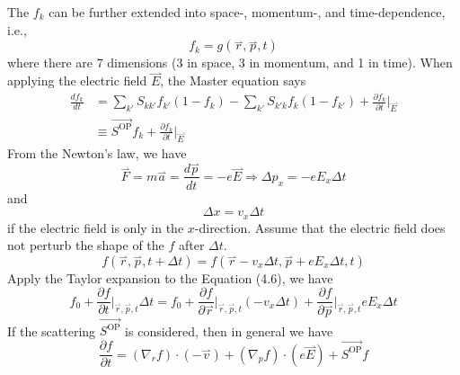The $f_{k}$ can be further extended into space-, momentum-, and time-dependence, i.e., \begin{equation}
    f_{k} = g(\overset{\rightharpoonup}{r}, \overset{\rightharpoonup}{p}, t)
\end{equation} where there are 7 dimensions (3 in space, 3 in momentum, and 1 in time). When applying the electric field $\overset{\rightharpoonup}{E}$, the Master equation says \begin{align}
    \frac{df_{k}}{dt}& = \sum_{k'}{S_{kk'}f_{k'}(1-f_{k})} - \sum_{k'}{S_{k'k}f_{k}(1-f_{k'})} + \frac{\partial f_{k}}{\partial t}\big|_{\overset{\rightharpoonup}{E}}\nonumber\\
    & \equiv \vec{S^{\text{OP}}}f_{k} + \frac{\partial f_{k}}{\partial t}\big|_{\overset{\rightharpoonup}{E}}
\end{align} From the Newton's law, we have \begin{equation}
    \overset{\rightharpoonup}{F} = m\overset{\rightharpoonup}{a} = \frac{d\overset{\rightharpoonup}{p}}{dt} = -e\overset{\rightharpoonup}{E}\Rightarrow\Delta p_{x} = -eE_{x}\Delta t
\end{equation} and \begin{equation}
    \Delta x = v_{x}\Delta t
\end{equation} if the electric field is only in the $x$-direction. Assume that the electric field does not perturb the shape of the $f$ after $\Delta t$. \begin{equation}
    f(\overset{\rightharpoonup}{r}, \overset{\rightharpoonup}{p}, t+\Delta t) = f(\overset{\rightharpoonup}{r}-v_{x}\Delta t, \overset{\rightharpoonup}{p}+eE_{x}\Delta t, t)
\end{equation} Apply the Taylor expansion to the Equation (4.6), we have \begin{equation}
    f_{0}+\frac{\partial f}{\partial t}\big|_{\overset{\rightharpoonup}{r}, \overset{\rightharpoonup}{p}, t}\Delta t = f_{0} + \frac{\partial f}{\partial \overset{\rightharpoonup}{r}}\big|_{\overset{\rightharpoonup}{r}, \overset{\rightharpoonup}{p}, t}(-v_{x}\Delta t) + \frac{\partial f}{\partial \overset{\rightharpoonup}{p}}\big|_{\overset{\rightharpoonup}{r}, \overset{\rightharpoonup}{p}, t}eE_{x}\Delta t
\end{equation} If the scattering $\vec{S^{\text{OP}}}$ is considered, then in general we have \begin{equation}
    \boxed{\frac{\partial f}{\partial t} = (\nabla_{r}f)\cdot(-\overset{\rightharpoonup}{v}) + (\nabla_{p}f)\cdot(e\overset{\rightharpoonup}{E}) + \vec{S^{\text{OP}}}f}

\end{equation}
